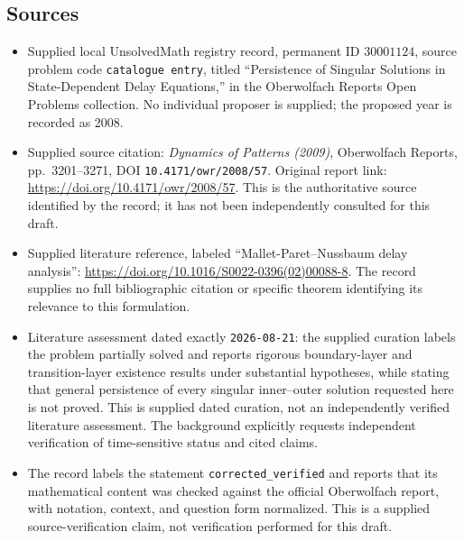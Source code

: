 \documentclass[11pt]{article}
\begin{document}
\subsection{Sources}
\begin{itemize}
\item Supplied local UnsolvedMath registry record, permanent ID \(30001124\), source problem code \texttt{catalogue entry}, titled ``Persistence of Singular Solutions in State-Dependent Delay Equations,'' in the Oberwolfach Reports Open Problems collection. No individual proposer is supplied; the proposed year is recorded as 2008.
\item Supplied source citation: \emph{Dynamics of Patterns (2009)}, Oberwolfach Reports, pp.\ 3201--3271, DOI \texttt{10.4171/owr/2008/57}. Original report link: \url{https://doi.org/10.4171/owr/2008/57}. This is the authoritative source identified by the record; it has not been independently consulted for this draft.
\item Supplied literature reference, labeled ``Mallet-Paret--Nussbaum delay analysis'': \url{https://doi.org/10.1016/S0022-0396(02)00088-8}. The record supplies no full bibliographic citation or specific theorem identifying its relevance to this formulation.
\item Literature assessment dated exactly \texttt{2026-08-21}: the supplied curation labels the problem partially solved and reports rigorous boundary-layer and transition-layer existence results under substantial hypotheses, while stating that general persistence of every singular inner--outer solution requested here is not proved. This is supplied dated curation, not an independently verified literature assessment. The background explicitly requests independent verification of time-sensitive status and cited claims.
\item The record labels the statement \texttt{corrected\_verified} and reports that its mathematical content was checked against the official Oberwolfach report, with notation, context, and question form normalized. This is a supplied source-verification claim, not verification performed for this draft.
\end{itemize}
\end{document}
